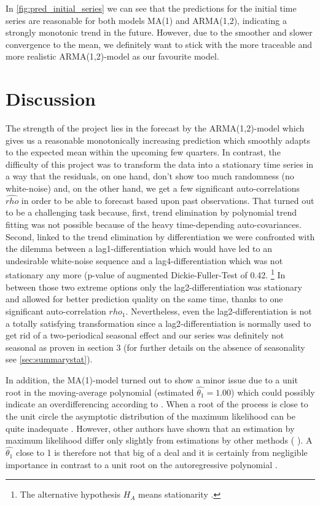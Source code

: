 \documentclass[11pt,a4paper]{article}
\begin{document}
In \cref{fig:pred_initial_series} we can see that the predictions for the initial time series are reasonable for both models MA(1) and ARMA(1,2), indicating a strongly monotonic trend in the future.
However, due to the smoother and slower convergence to the mean, we definitely want to stick with the more traceable and more realistic ARMA(1,2)-model as our favourite model.





\section{Discussion}
The strength of the project lies in the forecast by the ARMA(1,2)-model which gives us a reasonable monotonically increasing prediction which smoothly adapts to the expected mean within the upcoming few quarters.
In contrast, the difficulty of this project was to transform the data into a stationary time series in a way that the residuals, on one hand, don't show too much randomness (no white-noise) and, on the other hand, we get a few significant auto-correlations $\hat{rho}$ in order to be able to forecast based upon past observations.
That turned out to be a challenging task because, first, trend elimination by polynomial trend fitting was not possible because of the heavy time-depending auto-covariances.
Second, linked to the trend elimination by differentiation we were confronted with the dilemma between a lag1-differentiation which would have led to an undesirable white-noise sequence and a lag4-differentiation which was not stationary any more (p-value of augmented Dickie-Fuller-Test of 0.42.
\footnote{
    The alternative hypothesis $H_A$ means stationarity \citep{adf}.
}
In between those two extreme options only the lag2-differentiation was stationary and allowed for better prediction quality on the same time, thanks to one significant auto-correlation $\hat{rho_1}$.
Nevertheless, even the lag2-differentiation is not a totally satisfying transformation since a lag2-differentiation is normally used to get rid of a two-periodical seasonal effect and our series was definitely not seasonal as proven in section 3 (for further details on the absence of seasonality see \cref{sec:summarystat}).
 
In addition, the MA(1)-model turned out to show a minor issue due to a unit root in the moving-average polynomial (estimated $\hat{\theta_1} = 1.00$) which could possibly indicate an overdifferencing according to \cite[~p.194]{bd02}.
When a root of the process is close to the unit circle the asymptotic distribution of the maximum likelihood can be quite inadequate \citep{davidson81}.
However, other authors have shown that an estimation by maximum likelihood differ only slightly from estimations by other methods (\citep{davisdunsmuir96} ).
A $\hat{\theta_1}$ close to 1 is therefore not that big of a deal and it is certainly from negligible importance in contrast to a unit root on the autoregressive polynomial \citep{plosser77}.
\end{document}
